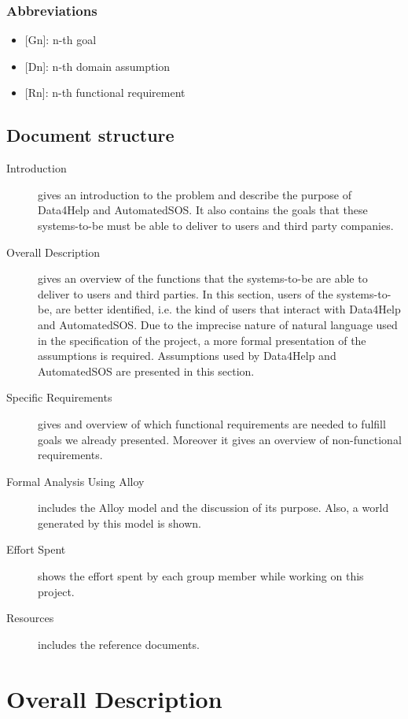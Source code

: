 \documentclass{article}
\begin{document}
\subsubsection{Abbreviations}
\begin{itemize}
	\item {[Gn]}: n-th goal
	\item {[Dn]}: n-th domain assumption
	\item {[Rn]}: n-th functional requirement
\end{itemize}
\subsection{Document structure}
\begin{description}
	\item [Introduction] gives an introduction to the problem and describe the purpose of Data4Help and AutomatedSOS. It also contains the goals that these systems-to-be must be able to deliver to users and third party companies.
	\item [Overall Description] gives an overview of the functions that the systems-to-be are able to deliver to users and third parties. In this section, users of the systems-to-be, are better identified, i.e. the kind of users that interact with Data4Help and AutomatedSOS. Due to the imprecise nature of natural language used in the specification of the project, a more formal presentation of the assumptions is required. Assumptions used by Data4Help and AutomatedSOS are presented in this section. 
	\item [Specific Requirements] gives and overview of which functional requirements are needed to fulfill goals we already presented. Moreover it gives an overview of non-functional requirements.
	\item [Formal Analysis Using Alloy] includes the Alloy model and the discussion of its purpose. Also, a world generated by this model is shown.
	\item [Effort Spent] shows the effort spent by each group member while working on this project.
	\item [Resources] includes the reference documents. 
\end{description}
\newpage
\section{Overall Description}
\end{document}
